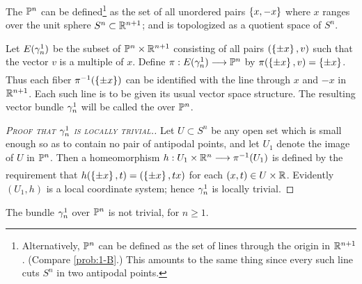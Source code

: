 \documentclass[../main]{subfiles}
\begin{document}
\begin{example}\label{ex:02.04}
The  $\mathbb{P}^{n}$ can be defined\footnote{
Alternatively, $\mathbb{P}^{n}$ can be defined as the set of lines through the origin in $\mathbb R^{n+1}$.
(Compare \ref{prob:1-B}.) This amounts to the same thing since every
such line cuts $S^{n}$ in two antipodal points.}
as the set of all unordered pairs $\left\{x, -x\right\}$ where $x$ ranges over the unit sphere
$S^{n} \subset\mathbb R^{n+1}$; and is topologized as a quotient space of $S^{n}$.

Let $E(\gamma^1_n)$ be the subset of $\mathbb{P}^{n}\times \mathbb R^{n+1}$ consisting of all pairs
$(\left\{\pm x\right\}, v)$ such that the vector $v$ is a multiple of $x$. Define $\pi: \total(\tautological^1_n)\varrightarrow{} \projective^{n}$
by $\pi(\left\{\pm x\right\} , v) = \left\{\pm x\right\}$. Thus each fiber $\pi^{-1}(\left\{\pm x\right\})$ can be identified with
the line through $x$ and $-x$ in $\mathbb R^{n+1}$. Each such line is to be given its
usual vector space structure. The resulting vector bundle $\gamma^1_n$ will be
called the  over $\mathbb{P}^{n}$.


\begin{proof}
[\textsc{Proof that $\gamma^1_n$ is locally trivial.}] Let $U \subset S^{n}$ be any open set which
is small enough so as to contain no pair of antipodal points, and let $U_1$
denote the image of $U$ in $\mathbb{P}^{n}$. Then a homeomorphism $h:U_1\times \bR^n\varrightarrow{}\pi\inv(U_1)$
is defined by the requirement that $h(\left\{\pm x\right\},t)=(\left\{\pm x\right\},tx)$ for each $(x, t)\in U \times \mathbb R$. Evidently $(U_1,h)$ is a local coordinate system; hence $\gamma^1_n$ is locally trivial.
\end{proof}

\end{example}


\begin{theorem}\label{thm:02.01}
The bundle $\gamma^1_n$ over $\mathbb{P}^{n}$ is not trivial, for $n \geq 1$.
\end{theorem}
\end{document}
